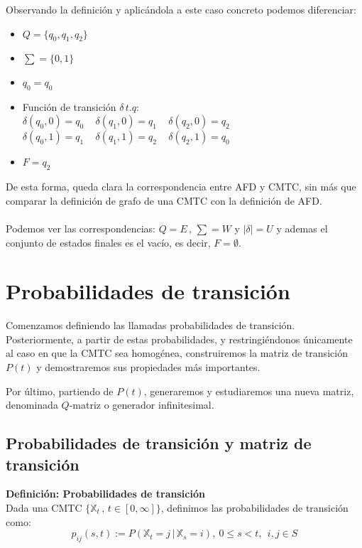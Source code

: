 \documentclass[12pt,a4paper]{article}
\begin{document}
Observando la definición y aplicándola a este caso concreto podemos diferenciar:
\begin{itemize}
\item $Q=\{q_0,q_1,q_2 \}$
\item $\sum = \{0,1\}$
\item $q_0=q_0$
\item Función de transición $\delta \, t.q$:
\\
$\delta(q_0,0)=q_0 \,\,\,\,\,\,\, \delta(q_1,0)=q_1\,\,\,\,\,\,\, \delta(q_2,0)=q_2$
\\
$\delta(q_0,1)=q_1 \,\,\,\,\,\,\,  \delta(q_1,1)=q_2 \,\,\,\,\,\,\,\delta(q_2,1)=q_0$
\item $F={q_2}$
\end{itemize}
De esta forma, queda clara la correspondencia entre AFD y CMTC, sin más que comparar la definición de grafo de una CMTC con la definición de AFD.
\\\\
Podemos ver las correspondencias: $Q=E\, ,\, \sum=W$ y $| \delta |=U$ y ademas el conjunto de estados finales es el vacío, es decir, $F={\emptyset}$. 

\section{Probabilidades de transición}

Comenzamos definiendo las llamadas probabilidades de transición. Posteriormente, a partir de estas probabilidades, y restringiéndonos únicamente al caso en que la CMTC sea homogénea, construiremos la matriz de transición $P(t)$ y demostraremos sus propiedades más importantes.

Por último, partiendo de $P(t)$, generaremos y estudiaremos una nueva matriz, denominada $Q$-matriz o generador infinitesimal.

\subsection{Probabilidades de transición y matriz de transición}
\textbf{Definición: Probabilidades de transición}
\\
Dada una CMTC $\{\mathbb{X}_t \, , \, t\in [0,\infty]\}$, definimos las probabilidades de transición como:
$$p_{ij}(s,t):=P(\mathbb{X}_t=j\, | \, \mathbb{X}_s=i), \ 0\leq s < t, \ \ i,j\in S$$
\end{document}
